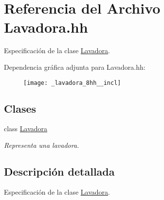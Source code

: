 \hypertarget{_lavadora_8hh}{}\section{Referencia del Archivo Lavadora.\+hh}
\label{_lavadora_8hh}


Especificación de la clase \hyperlink{class_lavadora}{Lavadora}.  


Dependencia gráfica adjunta para Lavadora.\+hh\+:\nopagebreak
\begin{figure}[H]
\begin{center}
\leavevmode
\texttt{[image: \_lavadora\_8hh\_\_incl]}
\end{center}
\end{figure}
\subsection*{Clases}
\begin{DoxyCompactItemize}
\item 
class \hyperlink{class_lavadora}{Lavadora}
\begin{DoxyCompactList}\small\item\em Representa una lavadora. \end{DoxyCompactList}\end{DoxyCompactItemize}


\subsection{Descripción detallada}
Especificación de la clase \hyperlink{class_lavadora}{Lavadora}. 

